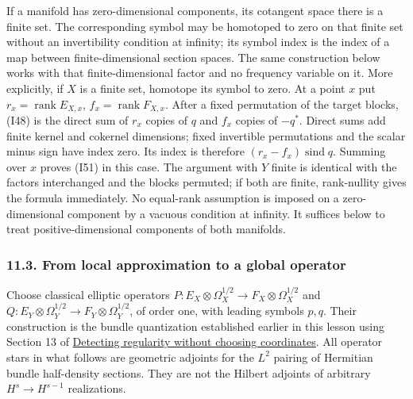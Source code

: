 \documentclass[
  11pt,
]{article}
\makeatletter
\let\ReaderOriginalAnchorStart\hyper@anchorstart
\let\ReaderOriginalAnchorEnd\hyper@anchorend
\let\ReaderPendingAliases\@empty
\def\ReaderArmAliases#1{\gdef\ReaderPendingAliases{#1}}
\def\hyper@anchorstart#1{\ReaderIfNativeAnchorTF{#1}{\ReaderPendingAliases\global\let\ReaderPendingAliases\@empty}{}\ReaderOriginalAnchorStart{#1}}
\makeatother
\begin{document}
If a manifold has zero-dimensional components, its cotangent space there
is a finite set. The corresponding symbol may be homotoped to zero on
that finite set without an invertibility condition at infinity; its
symbol index is the index of a map between finite-dimensional section
spaces. The same construction below works with that finite-dimensional
factor and no frequency variable on it. More explicitly, if \(X\) is a
finite set, homotope its symbol to zero. At a point \(x\) put
\(r_x=\operatorname{rank}E_{X,x}\), \(f_x=\operatorname{rank}F_{X,x}\).
After a fixed permutation of the target blocks, (I48) is the direct sum
of \(r_x\) copies of \(q\) and \(f_x\) copies of \(-q^*\). Direct sums
add finite kernel and cokernel dimensions; fixed invertible permutations
and the scalar minus sign have index zero. Its index is therefore
\((r_x-f_x)\operatorname{sind}q\). Summing over \(x\) proves (I51) in
this case. The argument with \(Y\) finite is identical with the factors
interchanged and the blocks permuted; if both are finite, rank-nullity
gives the formula immediately. No equal-rank assumption is imposed on a
zero-dimensional component by a vacuous condition at infinity. It
suffices below to treat positive-dimensional components of both
manifolds.

\ReaderArmAliases{\ReaderOriginalAnchorStart{pp-e-localization-makes-the-partial-approximation-global}\ReaderOriginalAnchorEnd\begingroup\expandafter\def\csname @currentHref\endcsname{pp-e-localization-makes-the-partial-approximation-global}\label{pp-e-localization-makes-the-partial-approximation-global}\endgroup\ReaderOriginalAnchorStart{11-3-from-local-approximation-to-a-global-operator}\ReaderOriginalAnchorEnd\begingroup\expandafter\def\csname @currentHref\endcsname{11-3-from-local-approximation-to-a-global-operator}\label{11-3-from-local-approximation-to-a-global-operator}\endgroup}
\subsubsection{11.3. From local approximation to a global
operator}\label{from-local-approximation-to-a-global-operator}

Choose classical elliptic operators
\(P:E_X\otimes\Omega_X^{1/2}\to F_X\otimes\Omega_X^{1/2}\) and
\(Q:E_Y\otimes\Omega_Y^{1/2}\to F_Y\otimes\Omega_Y^{1/2}\), of order
one, with leading symbols \(p,q\). Their construction is the bundle
quantization established earlier in this lesson using Section 13 of
\href{geometric-microlocal-calculus.pdf}{Detecting regularity without
choosing coordinates}. All operator stars in what follows are geometric
adjoints for the \(L^2\) pairing of Hermitian bundle half-density
sections. They are not the Hilbert adjoints of arbitrary
\(H^s\to H^{s-1}\) realizations.
\end{document}
